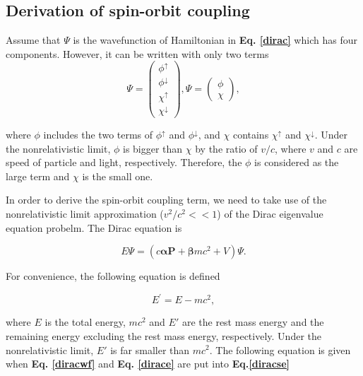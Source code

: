 \documentclass[a4paper, 12pt, titlepage,oneside,drop]{kthesis}
\begin{document}
\subsection{Derivation of spin-orbit coupling}

\noindent  Assume that $\Psi$ is the wavefunction of Hamiltonian in \textbf {Eq. \ref{dirac}} which has four components. However, it can be 
written with only two terms
\begin{equation}\label{diracwf}
\Psi= \left( \begin{array}{c}
\phi^{\uparrow} \\
\phi^{\downarrow} \\
\chi^{\uparrow} \\
\chi^{\downarrow} \end{array} \right),
 \Psi = \left(\begin{array}{c}
\phi \\               
\chi \end{array} \right),
\end{equation}

\noindent where $\phi$ includes the two terms of $\phi^{\uparrow}$ and $\phi^{\downarrow}$, and $\chi$ contains  $\chi^{\uparrow}$ and $\chi^{\downarrow}$.
Under the nonrelativistic limit, $\phi$ is bigger than $\chi$ by the ratio of $v/c$, where $v$ and $c$ are speed of particle and light, respectively.
Therefore, the $\phi$ is considered as the large term and $\chi$ is the small one.

\noindent In order to derive the spin-orbit coupling term, we need to take use of the nonrelativistic limit approximation ($v^2/c^2 << 1$) of the Dirac eigenvalue equation probelm. The Dirac equation is 

\begin{equation}\label{diracse}
 E \Psi = (c \boldsymbol{\alpha} \textbf{P} + \boldsymbol{\beta}mc^{2} + V) \Psi.
\end{equation}

\noindent For convenience, the following equation is defined

\begin{equation}\label{dirace}
E^{\prime} = E - mc^2,
\end{equation}

\noindent where $E$ is the total energy, $mc^2$ and $E'$ are the rest mass energy and the remaining energy excluding the rest mass energy, respectively. Under the nonrelativistic limit, 
$E'$ is far smaller than $mc^2$. The following equation is given when \textbf{Eq. \ref{diracwf}} and \textbf{Eq. \ref{dirace}} are put into \textbf{ Eq.\ref{diracse}}
\end{document}
